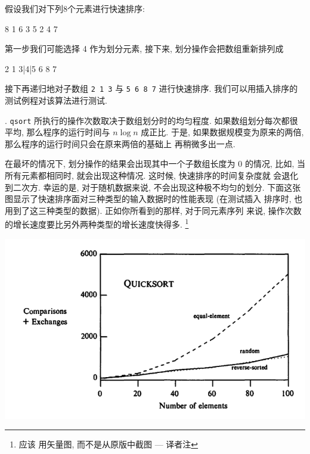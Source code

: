 假设我们对下列8个元素进行快速排序:
\begin{file}
    8 1 6 3 5 2 4 7
\end{file}
第一步我们可能选择 4 作为划分元素, 接下来, 划分操作会把数组重新排列成
\begin{file}
    2 1 3|4|5 6 8 7
\end{file}
接下再递归地对子数组 \texttt{2 1 3} 与 \texttt{5 6 8 7} 进行快速排序. 
我们可以用插入排序的测试例程对该算法进行测试.

. \texttt{qsort} 所执行的操作次数取决于数组划分时的均匀程度.
如果数组划分每次都很平均, 那么程序的运行时间与 $n \log n$ 成正比.
于是, 如果数据规模变为原来的两倍, 那么程序的运行时间只会在原来两倍的基础上
再稍微多出一点.

在最坏的情况下, 划分操作的结果会出现其中一个子数组长度为 0 的情况, 比如,
当所有元素都相同时, 就会出现这种情况. 这时候, 快速排序的时间复杂度就
会退化到二次方. 幸运的是, 对于随机数据来说, 不会出现这种极不均匀的划分. 
下面这张图显示了快速排序面对三种类型的输入数据时的性能表现 (在测试插入
排序时, 也用到了这三种类型的数据). 正如你所看到的那样, 对于同元素序列
来说, 操作次数的增长速度要比另外两种类型的增长速度快得多. \footnote{应该 
用矢量图, 而不是从原版中截图 --- 译者注}

\begin{center}
    \includegraphics[scale=0.7]{images/quicksort.png}
\end{center}

